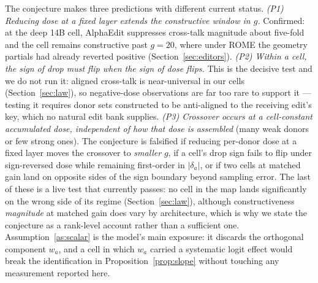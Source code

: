\documentclass[preprint,12pt]{elsarticle}
\theoremstyle{definition}
\begin{document}
The conjecture makes three predictions with different current status.
\emph{(P1) Reducing dose at a fixed layer extends the constructive window in $g$.}
Confirmed: at the deep 14B cell, AlphaEdit suppresses cross-talk magnitude about
five-fold and the cell remains constructive past $g{=}20$, where under ROME the geometry
partials had already reverted positive (Section~\ref{sec:editors}).
\emph{(P2) Within a cell, the sign of drop must flip when the sign of dose flips.}
This is the decisive test and we do not run it: aligned cross-talk is near-universal in
our cells (Section~\ref{sec:law}), so negative-dose observations are far too rare to
support it --- testing it requires donor sets constructed to be anti-aligned to the
receiving edit's key, which no natural edit bank supplies.
\emph{(P3) Crossover occurs at a cell-constant accumulated dose, independent of how that
dose is assembled} (many weak donors or few strong ones).
The conjecture is falsified if reducing per-donor dose at a fixed layer moves the
crossover to \emph{smaller} $g$, if a cell's drop sign fails to flip under sign-reversed
dose while remaining first-order in $|\delta_a|$, or if two cells at matched gain land on
opposite sides of the sign boundary beyond sampling error. The last of these is a live
test that currently passes: no cell in the map lands significantly on the wrong side of
its regime (Section~\ref{sec:law}), although constructiveness \emph{magnitude} at
matched gain does vary by architecture, which is why we state the conjecture as a
rank-level account rather than a sufficient one. Assumption~\ref{as:scalar} is the
model's main exposure: it discards the orthogonal component $w_a$, and a cell in which
$w_a$ carried a systematic logit effect would break the identification in
Proposition~\ref{prop:slope} without touching any measurement reported here.
\end{document}

